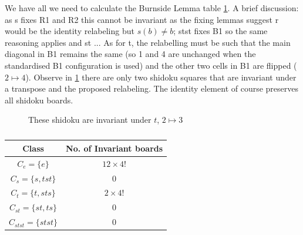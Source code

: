 \documentclass[a4paper,11pt]{report}
\newcounter{row}
\newcounter{col}
\newcounter{rowa}
\newcounter{cola}
\newcommand\setrowa[4]{
  \setcounter{cola}{1}
  \foreach \n in {#1, #2, #3, #4} {
    \edef\x{\value{cola} - 0.5}
    \edef\y{4.5 - \value{rowa}}
    \node[anchor=center] at (\x, \y) {\n};
    \stepcounter{cola}
  }
  \stepcounter{rowa}
}
\begin{document}
{We have all we need to calculate the Burnside Lemma table \ref{table:burnside}. A brief discussion: as s fixes R1 and R2 this cannot be invariant as the fixing lemmas suggest r would be the identity relabeling but $s(b)\neq b$; stst fixes B1 so the same reasoning applies and st ... As for t, the relabelling must be such that the main diagonal in B1 remains the same (so 1 and 4 are unchanged when the standardised B1 configuration is used) and the other two cells in B1 are flipped ($2\mapsto 4$). Observe in \ref{fig:transpose} there are only two shidoku squares that are invariant under a transpose and the proposed relabeling. The identity element of course preserves all shidoku boards.

\begin{figure}[h]
\centering
{}
\caption{These shidoku are invariant under $t$, $2\mapsto 3$}
\label{fig:transpose}
\end{figure}

\begin{table}[!h]
\begin{center}
\begin{tabular}{ |c|c| }
 \hline
Class  & No. of Invariant boards\\
 \hline
$C_e=\{e\}$&$12\times 4!$\\
$C_s = \{s,tst\}$&0\\
$C_t = \{t,sts\}$&$2\times4!$\\
$C_{st}=\{st,ts\}$&0\\
$C_{stst}=\{stst\}$&0\\
\hline
\end{tabular}
\end{center}
\caption{\label{table:burnside}}
\end{table}

}
\end{document}
